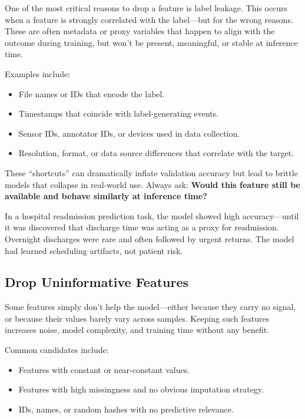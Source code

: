 \documentclass[12pt,openany]{book}
\begin{document}
One of the most critical reasons to drop a feature is label leakage. This occurs when a feature is strongly correlated with the label—but for the wrong reasons. These are often metadata or proxy variables that happen to align with the outcome during training, but won’t be present, meaningful, or stable at inference time.

Examples include:
\begin{itemize}
    \item File names or IDs that encode the label.
    \item Timestamps that coincide with label-generating events.
    \item Sensor IDs, annotator IDs, or devices used in data collection.
    \item Resolution, format, or data source differences that correlate with the target.
\end{itemize}

These “shortcuts” can dramatically inflate validation accuracy but lead to brittle models that collapse in real-world use. Always ask: \textbf{Would this feature still be available and behave similarly at inference time?}

\noindent\begin{minipage}{\textwidth}
\begin{examplebox}
In a hospital readmission prediction task, the model showed high accuracy—until it was discovered that discharge time was acting as a proxy for readmission. Overnight discharges were rare and often followed by urgent returns. The model had learned scheduling artifacts, not patient risk.
\end{examplebox}
\end{minipage}


\subsection{Drop Uninformative Features}

Some features simply don’t help the model—either because they carry no signal, or because their values barely vary across samples. Keeping such features increases noise, model complexity, and training time without any benefit.

Common candidates include:
\begin{itemize}
    \item Features with constant or near-constant values.
    \item Features with high missingness and no obvious imputation strategy.
    \item IDs, names, or random hashes with no predictive relevance.
\end{itemize}
\end{document}
